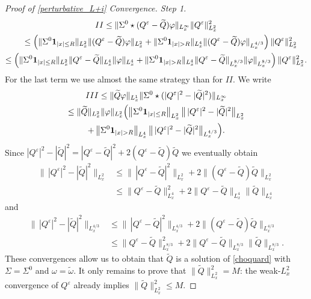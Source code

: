 \documentclass[11pt]{article}
\theoremstyle{definition}
\newenvironment{ProofOf}[1]{\begin{proof}[Proof of #1]}{\end{proof}}
\begin{document}
\begin{ProofOf}{\eqref{perturbative_L+i} Convergence. Step 1}
\bgroup
{}
\begin{multline*}
\textup{II}\leq\|\Sigma^{0}\star(Q^{\varepsilon}-\widetilde{Q})\varphi\|_{L_{x}^{\infty}}\|Q^{\varepsilon}\|_{L_{x}^{2}}^{2}\\
\shoveleft{\hphantom{\textup{II}}\leq\left(\|\Sigma^{0}\mathbf{1}_{|x|\leq R}\|_{L_{x}^{2}}\|(Q^{\varepsilon}-\widetilde{Q})\varphi\|_{L_{x}^{2}}+\|\Sigma^{0}\mathbf{1}_{|x|>R}\|_{L_{x}^{4}}\|(Q^{\varepsilon}-\widetilde{Q})\varphi\|_{L_{x}^{4/3}}\right)\|Q^{\varepsilon}\|_{L_{x}^{2}}^{2}}\\
\leq\left(\|\Sigma^{0}\mathbf{1}_{|x|\leq R}\|_{L_{x}^{2}}\|Q^{\varepsilon}-\widetilde{Q}\|_{L_{x}^{4}}\|\varphi\|_{L_{x}^{4}}+\|\Sigma^{0}\mathbf{1}_{|x|>R}\|_{L_{x}^{4}}\|Q^{\varepsilon}-\widetilde{Q}\|_{L_{x}^{8/3}}\|\varphi\|_{L_{x}^{8/3}}\right)\|Q^{\varepsilon}\|_{L_{x}^{2}}^{2}.
\end{multline*}
\egroup
For the last term we use almost the same strategy than for $II$. We write
\begin{multline*}
\textup{III}\leq\|\widetilde{Q}\varphi\|_{L_{x}^{1}}\|\Sigma^{0}\star(|Q^{\varepsilon}|^{2}-|\widetilde{Q}|^{2})\|_{L_{x}^{\infty}}\\
\leq\|\widetilde{Q}\|_{L_{x}^{2}}\|\varphi\|_{L_{x}^{2}}\Bigl(\left\|\Sigma^{0}\mathbf{1}_{|x|\leq R}\right\|_{L_{x}^{2}}\bigl\|\,|Q^{\varepsilon}|^{2}-|\widetilde{Q}|^{2}\bigr\|_{L_{x}^{2}}\\
+\left\|\Sigma^{0}\mathbf{1}_{|x|>R}\right\|_{L_{x}^{4}}\bigl\|\,|Q^{\varepsilon}|^{2}-|\widetilde{Q}|^{2}\bigr\|_{L_{x}^{4/3}}\Bigr).
\end{multline*}
Since $|Q^{\varepsilon}|^{2}-|\widetilde{Q}|^{2}=|Q^{\varepsilon}-\widetilde{Q}|^{2}+2(Q^{\varepsilon}-\widetilde{Q})\widetilde{Q}$ we eventually obtain
\begin{align*}
\bigl\|\,|Q^{\varepsilon}|^{2}-|\widetilde{Q}|^{2}\bigr\|_{L_{x}^{2}}&\leq\bigl\|\,|Q^{\varepsilon}-\widetilde{Q}|^{2}\bigr\|_{L_{x}^{2}}+2\bigl\|(Q^{\varepsilon}-\widetilde{Q})\widetilde{Q}\bigr\|_{L_{x}^{2}}\\
&\leq\bigl\|Q^{\varepsilon}-\widetilde{Q}\bigr\|_{L_{x}^{4}}^{2}+2\bigl\|Q^{\varepsilon}-\widetilde{Q}\bigr\|_{L_{x}^{4}}\bigl\|\widetilde{Q}\bigr\|_{L_{x}^{4}}
\end{align*}
and
\begin{align*}
\bigl\|\,|Q^{\varepsilon}|^{2}-|\widetilde{Q}|^{2}\bigr\|_{L_{x}^{4/3}}&\leq\bigl\|\,|Q^{\varepsilon}-\widetilde{Q}|^{2}\bigr\|_{L_{x}^{4/3}}+2\bigl\|(Q^{\varepsilon}-\widetilde{Q})\widetilde{Q}\bigr\|_{L_{x}^{4/3}}\\
&\leq\bigl\|Q^{\varepsilon}-\widetilde{Q}\bigr\|_{L_{x}^{8/3}}^{2}+2\bigl\|Q^{\varepsilon}-\widetilde{Q}\bigr\|_{L_{x}^{8/3}}\bigl\|\widetilde{Q}\bigr\|_{L_{x}^{8/3}}.
\end{align*}
These convergences allow us to obtain that $\widetilde{Q}$ is a solution of \eqref{choquard} with $\Sigma=\Sigma^{0}$ and $\omega=\widetilde{\omega}$. It only remains to prove that $\|\widetilde{Q}\|_{L_{x}^{2}}^{2}=M$: the weak-$L_{x}^{2}$ convergence of $Q^{\varepsilon}$ already implies $\|\widetilde{Q}\|_{L_{x}^{2}}^{2}\leq M$.


\end{ProofOf}
\end{document}
